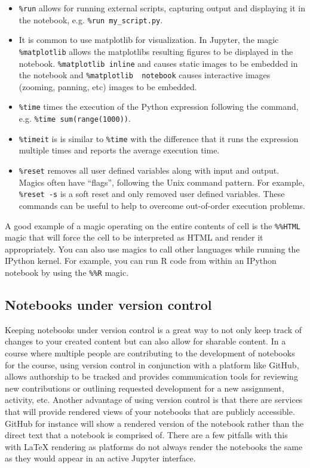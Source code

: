 \documentclass[]{book}
\begin{document}
\begin{itemize}
\item
  \texttt{\%run} allows for running external scripts, capturing output
  and displaying it in the notebook, e.g. \texttt{\%run\ my\_script.py}.
\item
  It is common to use matplotlib for visualization. In Jupyter, the
  magic \texttt{\%matplotlib} allows the matplotlibs resulting figures
  to be displayed in the notebook. \texttt{\%matplotlib\ inline} and
  causes static images to be embedded in the notebook and
  \texttt{\%matplotlib\ \ notebook} causes interactive images (zooming,
  panning, etc) images to be embedded.
\item
  \texttt{\%time} times the execution of the Python expression following
  the command, e.g. \texttt{\%time\ sum(range(1000))}.
\item
  \texttt{\%timeit} is is similar to \texttt{\%time} with the difference
  that it runs the expression multiple times and reports the average
  execution time.
\item
  \texttt{\%reset} removes all user defined variables along with input
  and output. Magics often have ``flags'', following the Unix command
  pattern. For example, \texttt{\%reset\ -s} is a soft reset and only
  removed user defined variables. These commands can be useful to help
  to overcome out-of-order execution problems.
\end{itemize}

A good example of a magic operating on the entire contents of cell is
the \texttt{\%\%HTML} magic that will force the cell to be interpreted
as HTML and render it appropriately. You can also use magics to call
other languages while running the IPython kernel. For example, you can
run R code from within an IPython notebook by using the \texttt{\%\%R}
magic.

\subsection{Notebooks under version
control}\label{notebooks-under-version-control}

Keeping notebooks under version control is a great way to not only keep
track of changes to your created content but can also allow for sharable
content. In a course where multiple people are contributing to the
development of notebooks for the course, using version control in
conjunction with a platform like GitHub, allows authorship to be tracked
and provides communication tools for reviewing new contributions or
outlining requested development for a new assignment, activity, etc.
Another advantage of using version control is that there are services
that will provide rendered views of your notebooks that are publicly
accessible. GitHub for instance will show a rendered version of the
notebook rather than the direct text that a notebook is comprised of.
There are a few pitfalls with this with LaTeX rendering as platforms do
not always render the notebooks the same as they would appear in an
active Jupyter interface.
\end{document}
